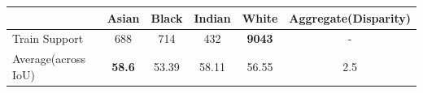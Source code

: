 \begin{tabular}{|l|cccc|c|}
\hline
~ & Asian & Black & Indian & White & Aggregate(Disparity) \\
\hline
Train Support & 688 & 714 & 432 & \textbf{9043} & - \\
\hline
Average(across IoU) & \textbf{58.6} & 53.39 & 58.11 & 56.55 & 2.5 \\
\hline
\end{tabular}